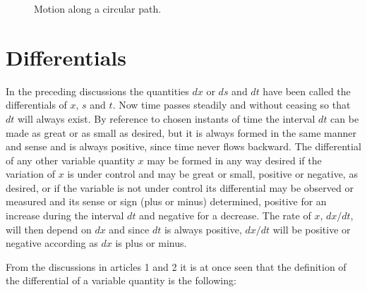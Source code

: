 \begin{figure}
\centering
{}
\caption{Motion along a circular path.}
\label{fig:circle_motion}
\end{figure}

\section{Differentials}
In the preceding discussions the quantities $dx$ or $ds$ and $dt$ have been called the differentials of $x$, $s$ and $t$. Now time passes steadily and without ceasing so that $dt$ will always exist. By reference to chosen instants of time the interval $dt$ can be made as great or as small as desired, but it is always formed in the same manner and sense and is always positive, since time never flows backward. The differential of any other variable quantity $x$ may be formed in any way desired if the variation of $x$ is under control and may be great or small, positive or negative, as desired, or if the variable is not under control its differential may be observed or measured and its sense or sign (plus or minus) determined, positive for an increase during the interval $dt$ and negative for a decrease. The rate of $x$, $dx/dt$, will then depend on $dx$ and since $dt$ is always positive, $dx/dt$ will be positive or negative according as $dx$ is plus or minus.

From the discussions in articles 1 and 2 it is at once seen that the definition of the differential of a variable quantity is the following:

